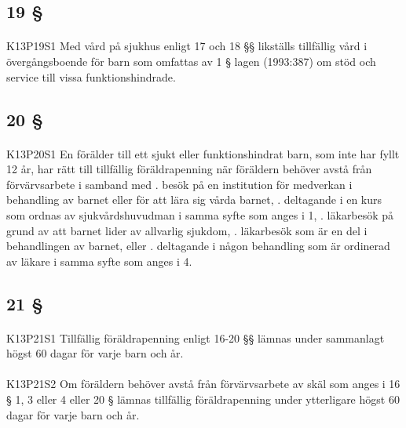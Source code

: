 \documentclass[a4paper,notitlepage,openany,10pt]{book}
\begin{document}
\subsection*{19 §}
\paragraph*{}
{\tiny K13P19S1}
Med vård på sjukhus enligt 17 och 18 §§ likställs tillfällig vård i övergångsboende för barn som omfattas av 1 § lagen (1993:387) om stöd och service till vissa funktionshindrade.
\subsection*{20 §}
\paragraph*{}
{\tiny K13P20S1}
En förälder till ett sjukt eller funktionshindrat barn, som inte har fyllt 12 år, har rätt till tillfällig föräldrapenning när föräldern behöver avstå från förvärvsarbete i samband med
. besök på en institution för medverkan i behandling av barnet eller för att lära sig vårda barnet,
. deltagande i en kurs som ordnas av sjukvårdshuvudman i samma syfte som anges i 1,
. läkarbesök på grund av att barnet lider av allvarlig sjukdom,
. läkarbesök som är en del i behandlingen av barnet, eller
. deltagande i någon behandling som är ordinerad av läkare i samma syfte som anges i 4.
\subsection*{21 §}
\paragraph*{}
{\tiny K13P21S1}
Tillfällig föräldrapenning enligt 16-20 §§ lämnas under sammanlagt högst 60 dagar för varje barn och år.
\paragraph*{}
{\tiny K13P21S2}
Om föräldern behöver avstå från förvärvsarbete av skäl som anges i 16 § 1, 3 eller 4 eller 20 § lämnas tillfällig föräldrapenning under ytterligare högst 60 dagar för varje barn och år.
\end{document}
